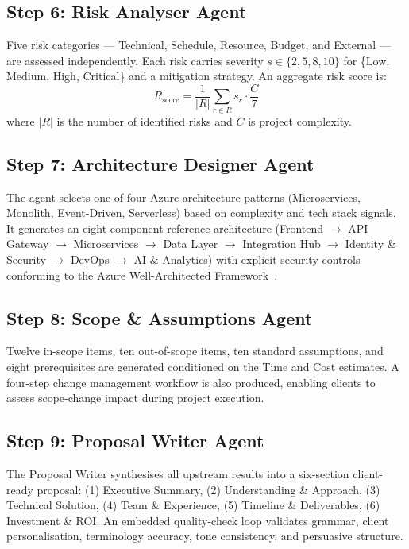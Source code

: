 \documentclass[10pt,twocolumn]{article}
\begin{document}
\subsection{Step 6: Risk Analyser Agent}

Five risk categories — Technical, Schedule, Resource, Budget, and External —
are assessed independently. Each risk carries severity
$s \in \{2, 5, 8, 10\}$ for \{Low, Medium, High, Critical\} and a
mitigation strategy. An aggregate risk score is:
\begin{equation}
R_{\text{score}} = \frac{1}{|R|} \sum_{r \in R} s_r \cdot \frac{C}{7}
\label{eq:risk}
\end{equation}
where $|R|$ is the number of identified risks and $C$ is project complexity.

\subsection{Step 7: Architecture Designer Agent}

The agent selects one of four Azure architecture patterns
(Microservices, Monolith, Event-Driven, Serverless) based on complexity
and tech stack signals. It generates an eight-component reference architecture
(Frontend $\to$ API Gateway $\to$ Microservices $\to$ Data Layer $\to$
Integration Hub $\to$ Identity \& Security $\to$ DevOps $\to$ AI \& Analytics)
with explicit security controls conforming to the Azure Well-Architected
Framework~\cite{microsoft2024waf}.

\subsection{Step 8: Scope \& Assumptions Agent}

Twelve in-scope items, ten out-of-scope items, ten standard assumptions, and
eight prerequisites are generated conditioned on the Time and Cost estimates.
A four-step change management workflow is also produced, enabling clients to
assess scope-change impact during project execution.

\subsection{Step 9: Proposal Writer Agent}

The Proposal Writer synthesises all upstream results into a six-section
client-ready proposal: (1) Executive Summary, (2) Understanding \& Approach,
(3) Technical Solution, (4) Team \& Experience, (5) Timeline \& Deliverables,
(6) Investment \& ROI. An embedded quality-check loop validates grammar,
client personalisation, terminology accuracy, tone consistency, and
persuasive structure.
\end{document}
